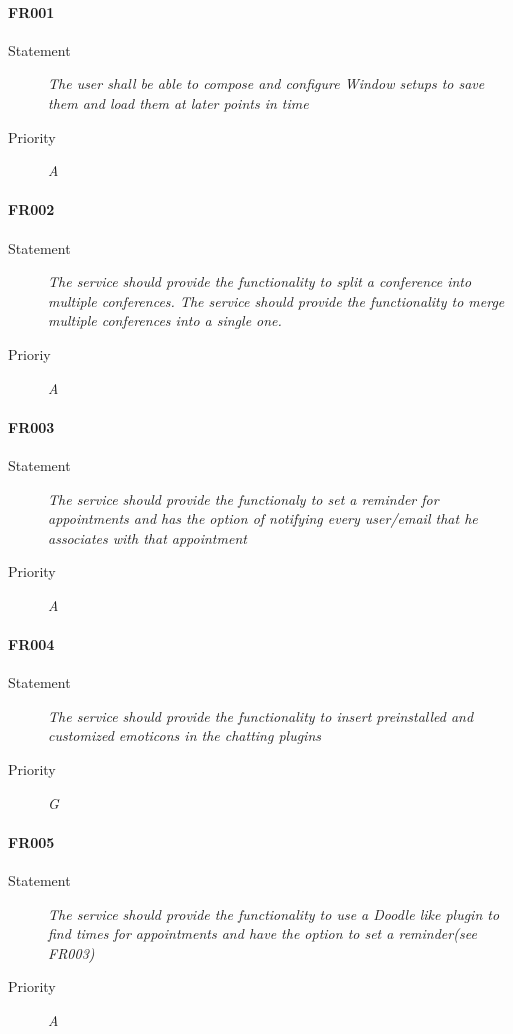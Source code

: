 \paragraph{FR001}
\begin{description}
  \item [Statement] 
    \textit{The user shall be able to compose and configure \gls{Window} setups to save them and load them at later points in time}
  \item [Priority] \textit{A}
\end{description}

\paragraph{FR002}
\begin{description}
  \item [Statement]
    \textit{The service should provide the functionality to split a conference into multiple conferences. The service should provide the functionality to merge multiple conferences into a single one.}
  \item [Prioriy] \textit{A}
\end{description}

\paragraph{FR003}
\begin{description}
  \item [Statement] 
    \textit{The service should provide the functionaly to set a reminder for appointments and has the option of notifying every user/email that he associates with that appointment}
  \item [Priority] \textit{A}
\end{description}

\paragraph{FR004}
\begin{description}
  \item [Statement] 
    \textit{The service should provide the functionality to insert preinstalled and customized emoticons in the chatting plugins}
  \item [Priority] \textit{G}
\end{description}

\paragraph{FR005}
\begin{description}
  \item [Statement] 
    \textit{The service should provide the functionality to use a Doodle like plugin to find times for appointments and have the option to set a reminder(see FR003)}
  \item [Priority] \textit{A}
\end{description}


